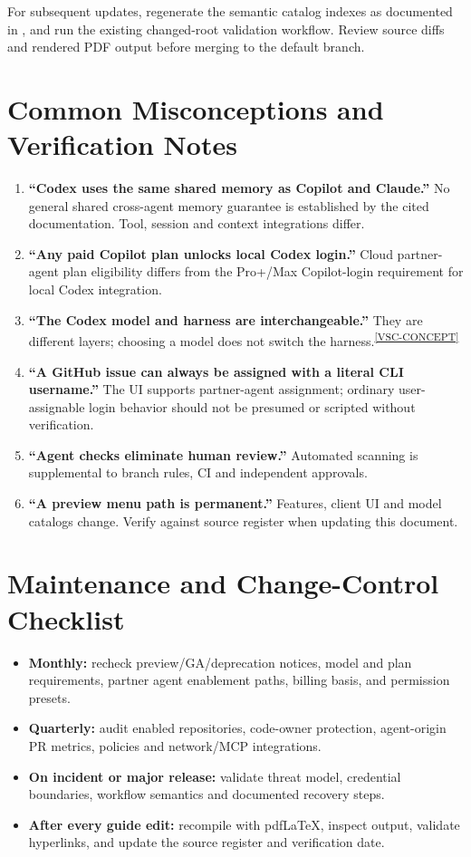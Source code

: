 \documentclass[11pt,letterpaper,oneside]{article}
\newcommand{\cmd}[1]{\path{#1}}
\newcommand{\src}[1]{\textsuperscript{\hyperref[ref:#1]{[#1]}}}
\begin{document}
For subsequent updates, regenerate the semantic catalog indexes as documented in \cmd{catalog/README.md}, and run the existing changed-root validation workflow. Review source diffs and rendered PDF output before merging to the default branch.

\section{Common Misconceptions and Verification Notes}
\begin{enumerate}
\item \textbf{``Codex uses the same shared memory as Copilot and Claude.''} No general shared cross-agent memory guarantee is established by the cited documentation. Tool, session and context integrations differ.
\item \textbf{``Any paid Copilot plan unlocks local Codex login.''} Cloud partner-agent plan eligibility differs from the Pro+/Max Copilot-login requirement for local Codex integration.
\item \textbf{``The Codex model and harness are interchangeable.''} They are different layers; choosing a model does not switch the harness.\src{VSC-CONCEPT}
\item \textbf{``A GitHub issue can always be assigned with a literal \cmd{@codex} CLI username.''} The UI supports partner-agent assignment; ordinary user-assignable login behavior should not be presumed or scripted without verification.
\item \textbf{``Agent checks eliminate human review.''} Automated scanning is supplemental to branch rules, CI and independent approvals.
\item \textbf{``A preview menu path is permanent.''} Features, client UI and model catalogs change. Verify against source register when updating this document.
\end{enumerate}

\section{Maintenance and Change-Control Checklist}
\begin{itemize}
\item \textbf{Monthly:} recheck preview/GA/deprecation notices, model and plan requirements, partner agent enablement paths, billing basis, and permission presets.
\item \textbf{Quarterly:} audit enabled repositories, code-owner protection, agent-origin PR metrics, policies and network/MCP integrations.
\item \textbf{On incident or major release:} validate threat model, credential boundaries, workflow semantics and documented recovery steps.
\item \textbf{After every guide edit:} recompile with pdfLaTeX, inspect output, validate hyperlinks, and update the source register and verification date.
\end{itemize}
\end{document}
